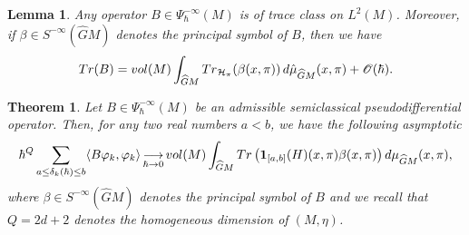 \documentclass[10pt,a4paper]{amsart}
\newtheorem{theorem}{Theorem}
\newtheorem{lemma}{Lemma}
\def \Ghat{\widehat{G}}
\def \O{\mathscr{O}}
\def\Tend#1#2{\mathop{\longrightarrow}\limits_{#1\rightarrow#2}}
\begin{document}
\begin{lemma}
    \label{lem:traceclass}
    Any operator $B\in \Psi_\hbar^{-\infty}(M)$ is of trace class on $L^2(M)$. Moreover, if $\beta\in S^{-\infty}(\Ghat M)$ denotes the principal symbol of $B$, then we have
    \begin{equation*}
        {\rm Tr}(B) = {\rm vol}(M)\int_{\Ghat M} {\rm Tr}_{\mathcal{H}_\pi}(\beta(x,\pi))\,d\hat{\mu}_{\Ghat M}(x,\pi) + \O(\hbar).
    \end{equation*}
\end{lemma}

\begin{theorem}
    \label{thm:microlocalweyllaw}
    Let $B\in \Psi_\hbar^{-\infty}(M)$ be an admissible semiclassical pseudodifferential operator. Then, for any two real numbers $a < b$, we have the following asymptotic
    \begin{equation*}
        \hbar^{Q} \sum_{a\leq \delta_k(\hbar)\leq b}\langle B\varphi_k,\varphi_k\rangle \Tend{\hbar}{0} {\rm vol}(M)\int_{\Ghat M} {\rm Tr}\left({\bm 1}_{[a,b]}(H)(x,\pi)\beta(x,\pi)\right) d\mu_{\Ghat M}(x,\pi),
    \end{equation*}
    where $\beta \in S^{-\infty}(\Ghat M)$ denotes the principal symbol of $B$ and we recall that $Q = 2d+2$ denotes the \emph{homogeneous dimension} of $(M,\eta)$.
\end{theorem}
\end{document}

